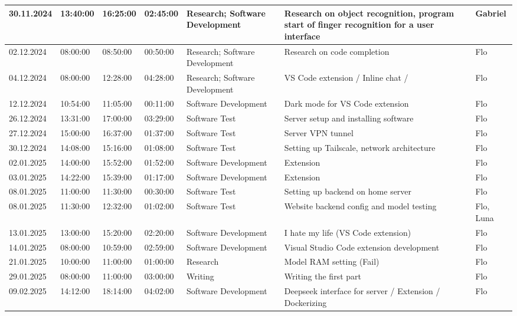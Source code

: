 \begin{longtable}{@{}p{1.8cm} p{1.2cm} p{1.2cm} p{1.2cm} p{2cm} p{4.5cm} p{2cm}@{}}
    \hline
    30.11.2024 & 13:40:00 & 16:25:00 & 02:45:00 & Research; Software Development & Research on object recognition, program start of finger recognition for a user interface & Gabriel \\
    \hline
    02.12.2024 & 08:00:00 & 08:50:00 & 00:50:00 & Research; Software Development & Research on code completion & Flo \\
    \hline
    04.12.2024 & 08:00:00 & 12:28:00 & 04:28:00 & Research; Software Development & VS Code extension / Inline chat / & Flo \\
    \hline
    12.12.2024 & 10:54:00 & 11:05:00 & 00:11:00 & Software Development & Dark mode for VS Code extension & Flo \\
    \hline
    26.12.2024 & 13:31:00 & 17:00:00 & 03:29:00 & Software Test & Server setup and installing software & Flo \\
    \hline
    27.12.2024 & 15:00:00 & 16:37:00 & 01:37:00 & Software Test & Server VPN tunnel & Flo \\
    \hline
    30.12.2024 & 14:08:00 & 15:16:00 & 01:08:00 & Software Test & Setting up Tailscale, network architecture & Flo \\
    \hline
    02.01.2025 & 14:00:00 & 15:52:00 & 01:52:00 & Software Development & Extension & Flo \\
    \hline
    03.01.2025 & 14:22:00 & 15:39:00 & 01:17:00 & Software Development & Extension & Flo \\
    \hline
    08.01.2025 & 11:00:00 & 11:30:00 & 00:30:00 & Software Test & Setting up backend on home server & Flo \\
    \hline
    08.01.2025 & 11:30:00 & 12:32:00 & 01:02:00 & Software Test & Website backend config and model testing & Flo, Luna \\
    \hline
    13.01.2025 & 13:00:00 & 15:20:00 & 02:20:00 & Software Development & I hate my life (VS Code extension) & Flo \\
    \hline
    14.01.2025 & 08:00:00 & 10:59:00 & 02:59:00 & Software Development & Visual Studio Code extension development & Flo \\
    \hline
    21.01.2025 & 10:00:00 & 11:00:00 & 01:00:00 & Research & Model RAM setting (Fail) & Flo \\
    \hline
    29.01.2025 & 08:00:00 & 11:00:00 & 03:00:00 & Writing & Writing the first part & Flo \\
    \hline
    09.02.2025 & 14:12:00 & 18:14:00 & 04:02:00 & Software Development & Deepseek interface for server / Extension / Dockerizing & Flo \\

\end{longtable}
